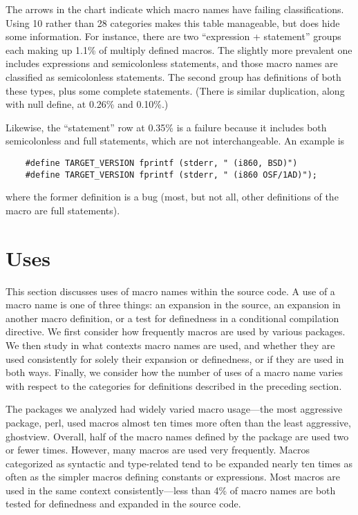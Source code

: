 \documentclass[10pt]{article}
\newcommand{\pkg}[1]{\textsf{#1}}
\begin{document}
The arrows in the chart indicate which macro names have failing
classifications.  Using 10 rather than 28 categories makes this table
manageable, but does hide some information.  For instance, 
there are two ``expression + statement'' groups each making up
1.1\% of multiply defined macros.  The slightly more prevalent one includes
expressions and semicolonless statements, and those macro names are
classified as semicolonless statements.  The second group has definitions
of both these types, plus some complete statements.  (There is similar
duplication, along with null define, at 0.26\% and 0.10\%.)

Likewise, the ``statement'' row at 0.35\% is a failure because it includes
both semicolonless and full statements, which are not interchangeable.  An
example is
\begin{verbatim}
    #define TARGET_VERSION fprintf (stderr, " (i860, BSD)")
    #define TARGET_VERSION fprintf (stderr, " (i860 OSF/1AD)");
\end{verbatim}
where the former definition is a bug (most, but not all, other definitions
of the macro are full statements).




\section{Uses}

This section discusses uses of macro names within the source code.  A
use of a macro name is one of three things: an expansion in the source,
an expansion in another macro definition, or a test for definedness in a
conditional compilation directive.  We first consider how frequently
macros are used by various packages.  We then study in what contexts
macro names are used, and whether they are used consistently for solely
their expansion or definedness, or if they are used in both ways.
Finally, we consider how the number of uses of a macro name varies with
respect to the categories for definitions described in the preceding
section.

The packages we analyzed had widely varied macro usage---the most
aggressive package, \pkg{perl}, used macros almost ten times more often
than the least aggressive, \pkg{ghostview}.  Overall, half of the macro
names defined by the package are used two or fewer times.  However, many
macros are used very frequently.  Macros categorized as syntactic and
type-related tend to be expanded nearly ten times as often as the
simpler macros defining constants or expressions.  Most macros are used
in the same context consistently---less than 4\% of macro names are both
tested for definedness and expanded in the source code.
\end{document}
